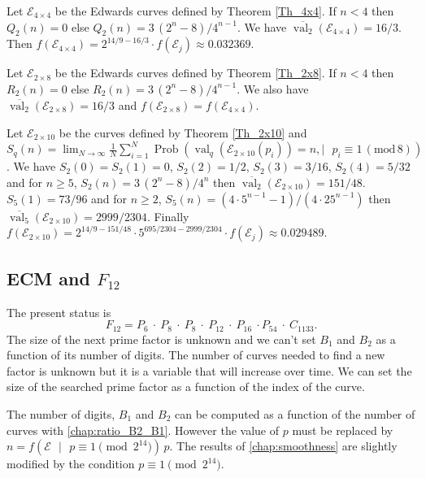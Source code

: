\documentclass[a4paper, 11pt, pdftex]{report}
\theoremstyle{plain}
\theoremstyle{definition}
\DeclareMathOperator{\val}{val}
\DeclareMathOperator{\Prob}{Prob}
\begin{document}
Let $\mathcal{E}_{4\times4}$ be the Edwards curves defined by Theorem \ref{Th_4x4}.
If $n < 4$ then $Q_2(n) = 0$ else $Q_2(n) = 3\,(2^n - 8)/4^{n-1}$. We have
$\overline{\val_2}(\mathcal{E}_{4\times4}) = 16/3$. Then $f(\mathcal{E}_{4\times4})
= 2^{14/9 - 16/3}\cdot f(\mathcal{E}_j) \approx 0.032369$.

Let $\mathcal{E}_{2\times8}$ be the Edwards curves defined by Theorem \ref{Th_2x8}.
If $n < 4$ then $R_2(n) = 0$ else $R_2(n) = 3\,(2^n - 8)/4^{n-1}$. We also have
$\overline{\val_2}(\mathcal{E}_{2\times8}) = 16/3$ and
$f(\mathcal{E}_{2\times8}) = f(\mathcal{E}_{4\times4})$.

Let $\mathcal{E}_{2\times10}$ be the curves defined by Theorem \ref{Th_2x10} and
$S_q(n) = \lim_{N \to \infty} \frac{1}{N} \sum_{i = 1}^N
\Prob(\val_q(\mathcal{E}_{2\times10}(p_i)) = n, |\text{ } p_i \equiv 1\, (\text{mod}\,8))$.
We have $S_2(0) = S_2(1) = 0$, $S_2(2) = 1/2$, $S_2(3) = 3/16$, $S_2(4) = 5/32$ and
for $n \geq 5$, $S_2(n) = 3\,(2^n - 8)/4^n$ then
$\overline{\val_2}(\mathcal{E}_{2\times10}) = 151/48$. $S_5(1) = 73/96$ and for $n \geq 2$,
$S_5(n) = (4\cdot 5^{n-1} - 1)/(4\cdot 25^{n-1})$ then
$\overline{\val_5}(\mathcal{E}_{2\times10}) = 2999/2304$.
Finally $f(\mathcal{E}_{2\times10})
= 2^{14/9 - 151/48}\cdot 5^{695/2304 - 2999/2304}\cdot f(\mathcal{E}_j) \approx 0.029489$.

\subsection{ECM and $F_{12}$}

The present status is
$$F_{12} = P_6 \:\cdot\: P_8 \:\cdot\: P_8 \:\cdot\: P_{12} \:\cdot\: P_{16} \:\cdot P_{54}
\:\cdot\: C_{1133}.$$
The size of the next prime factor is unknown and we can't set $B_1$ and $B_2$ as a function
of its number of digits. The number of curves needed to find a new factor is unknown but it
is a variable that will increase over time. We can set the size of the searched prime factor
as a function of the index of the curve.

The number of digits, $B_1$ and $B_2$ can be computed as a function of the number of curves
with \autoref{chap:ratio_B2_B1}. However the value of $p$ must be replaced by
$n = f(\mathcal{E} \text{ }|\text{ } p \equiv 1 \pmod{2^{14}})\,p$. The results of
\autoref{chap:smoothness} are slightly modified by the condition $p \equiv 1 \pmod{2^{14}}$.
\end{document}

